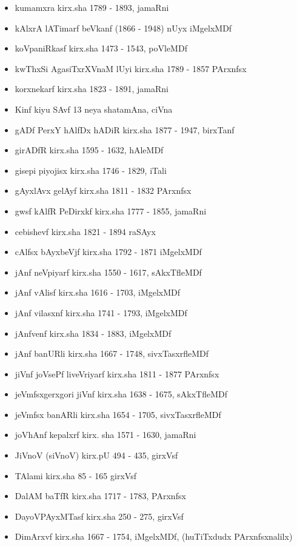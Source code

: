 {\begin{itemize}
\item kumamxra kirx.sha {\rm 1789 - 1893}, jamaRni
\item kAlxrA lATimarf beVkanf {\rm (1866 - 1948)} nUyx iMgelxMDf
\item koVpaniRkasf kirx.sha {\rm 1473 - 1543}, poVleMDf
\item kwThxSi AgasiTxrXVnaM lUyi kirx.sha {\rm 1789 - 1857} PArxnfsx
\item korxnekarf kirx.sha {\rm 1823 - 1891}, jamaRni
\item Kinf kiyu SAvf {\rm 13} neya shatamAna, ciVna
\item gADf PerxY hAlfDx hADiR kirx.sha {\rm 1877 - 1947}, birxTanf
\item girADfR kirx.sha {\rm 1595 - 1632}, hAleMDf
\item gisepi piyojisx kirx.sha {\rm 1746 - 1829}, iTali
\item gAyxlAvx gelAyf kirx.sha {\rm 1811 - 1832} PArxnfsx
\item gwsf kAlfR PeDirxkf kirx.sha {\rm 1777 - 1855}, jamaRni
\item cebishevf kirx.sha {\rm 1821 - 1894} raSAyx
\item cAlfsx bAyxbeVjf kirx.sha {\rm 1792 - 1871} iMgelxMDf
\item jAnf neVpiyarf kirx.sha {\rm 1550 - 1617}, sAkxTfleMDf
\item jAnf vAlisf kirx.sha {\rm 1616 - 1703}, iMgelxMDf
\item jAnf vilasxnf kirx.sha {\rm 1741 - 1793}, iMgelxMDf
\item jAnfvenf kirx.sha {\rm 1834 - 1883}, iMgelxMDf
\item jAnf banURli kirx.sha {\rm 1667 - 1748}, sivxTasxrfleMDf
\item jiVnf joVsePf liveVriyarf kirx.sha {\rm 1811 - 1877} PArxnfsx
\item jeVmfsxgerxgori jiVnf kirx.sha {\rm 1638 - 1675}, sAkxTfleMDf
\item jeVmfsx banARli kirx.sha {\rm 1654 - 1705}, sivxTasxrfleMDf
\item joVhAnf kepalxrf kirx. sha {\rm 1571 - 1630}, jamaRni
\item JiVnoV (siVnoV) kirx.pU {\rm 494 - 435}, girxVsf
\item TAlami kirx.sha {\rm 85 - 165} girxVsf
\item DalAM baTfR kirx.sha {\rm 1717 - 1783}, PArxnfsx
\item DayoVPAyxMTasf kirx.sha {\rm 250 - 275}, girxVsf
\item DimArxvf kirx.sha {\rm 1667 - 1754}, iMgelxMDf, (huTiTxdudx PArxnfsxnalilx)

\end{itemize}}
